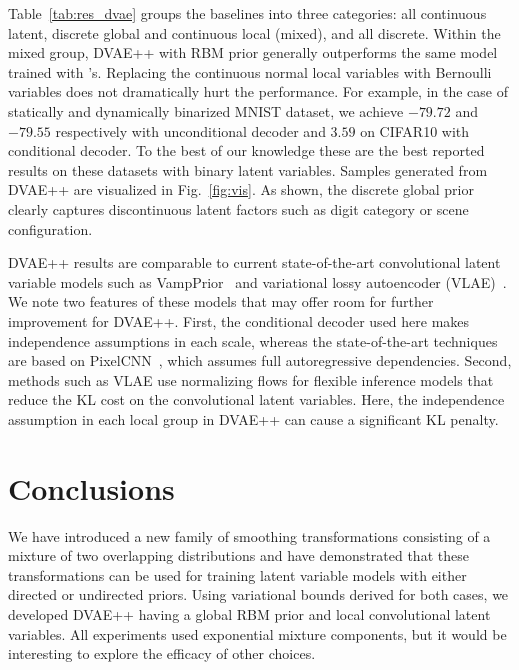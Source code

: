 \documentclass{article}
\begin{document}
Table~\ref{tab:res_dvae} groups the baselines into three categories: all continuous latent, discrete global and continuous local (mixed), and all discrete. Within the mixed 
group, DVAE++ with RBM prior generally outperforms the same model trained with \cite{rolfe2016discrete}'s. Replacing the continuous normal local variables with Bernoulli variables does not dramatically hurt the performance. For example, in the case of statically and dynamically binarized MNIST dataset, we achieve $-79.72$ and $-79.55$ respectively with unconditional 
decoder and $3.59$ on CIFAR10 with conditional decoder. To the best of our knowledge these are the best reported results on these datasets with binary latent variables. 
Samples generated from DVAE++ are visualized in Fig.~\ref{fig:vis}. As shown, the discrete global prior clearly captures discontinuous latent factors such as digit category or scene configuration.

DVAE++ results are comparable to current state-of-the-art convolutional latent variable models such as VampPrior~\cite{tomczak2017vae} and variational lossy autoencoder (VLAE)~\cite{chen2016variational}. We note two features of these models that may offer room for further improvement for DVAE++. First, the conditional decoder used here makes independence 
assumptions in each scale, whereas the state-of-the-art techniques are based on PixelCNN~\cite{van2016pixel}, which assumes full autoregressive dependencies. Second, methods such as VLAE use normalizing flows for flexible inference models that reduce the KL cost on the convolutional latent variables. Here, the independence assumption in each local group in
DVAE++ can cause a significant KL penalty. 

\section{Conclusions}
We have introduced a new family of smoothing transformations consisting 
of a mixture of two overlapping distributions and have demonstrated that
these transformations can be used for training latent variable models
with either directed or undirected priors. Using variational bounds
derived for both cases, we developed DVAE++ having a global RBM prior
and local convolutional latent variables. All experiments used exponential mixture components, but it
would be interesting to explore the efficacy of other choices.




\clearpage
\appendix
\end{document}
